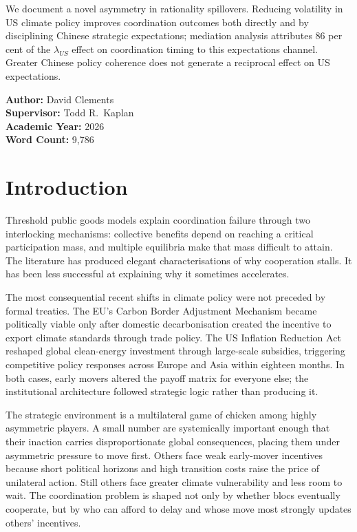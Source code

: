 \documentclass[10pt,a4paper]{article}
\begin{document}
\begin{titlepage}
We document a novel asymmetry in rationality spillovers. Reducing volatility in US climate policy improves
coordination outcomes both directly and by disciplining Chinese strategic expectations; mediation analysis
attributes 86 per cent of the $\lambda_{US}$ effect on coordination timing to this expectations channel.
Greater Chinese policy coherence does not generate a reciprocal effect on US expectations.

\vfill
\noindent\textbf{Author:} David Clements\\
\textbf{Supervisor:} Todd R.\ Kaplan\\
\textbf{Academic Year:} 2026\\
\textbf{Word Count:} 9,786
\end{titlepage}

\clearpage
\tableofcontents
\clearpage

\clearpage
\needspace{12em}
\section{Introduction}

Threshold public goods models explain coordination failure through two interlocking mechanisms:
collective benefits depend on reaching a critical participation mass, and multiple equilibria make that
mass difficult to attain. The literature has produced elegant characterisations of why cooperation stalls. It
has been less successful at explaining why it sometimes accelerates.

The most consequential recent shifts in climate policy were not preceded by formal treaties. The EU's Carbon Border Adjustment Mechanism became politically viable only after domestic decarbonisation created the incentive to export climate standards through trade policy. The US Inflation Reduction Act reshaped global clean-energy investment through large-scale subsidies, triggering competitive policy responses across Europe and Asia within eighteen months. In both cases, early movers altered the payoff matrix for everyone else; the institutional architecture followed strategic logic rather than producing it.

The strategic environment is a multilateral game of chicken among highly asymmetric players. A small number are systemically important enough that their inaction carries disproportionate global consequences, placing them under asymmetric pressure to move first. Others face weak early-mover incentives because short political horizons and high transition costs raise the price of unilateral action. Still others face greater climate vulnerability and less room to wait. The coordination problem is shaped not only by whether blocs eventually cooperate, but by who can afford to delay and whose move most strongly updates others' incentives.
\end{document}
